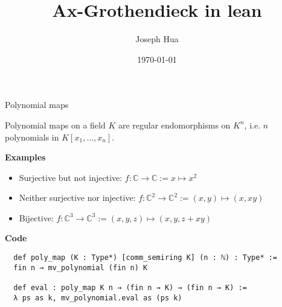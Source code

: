 \documentclass[10pt]{beamer}
\title{Ax-Grothendieck in lean}
\subtitle{Joseph Hua}
\date{\today}
\institute{Imperial College London}
\newcommand{\C}{\mathbb{C}}
\newcommand{\<}{\langle}
\renewcommand{\>}{\rangle}
\newcommand{\link}[1]{\hypertarget{#1}{}}
\begin{document}
\maketitle

\begin{frame}[fragile]{Polynomial maps}

  \begin{definition}
    \link{poly_map}
    Polynomial maps on a field $K$ are regular endomorphisms on $K^{n}$,
    i.e. $n$ polynomials in $K[x_1,\dots,x_{n}]$.
  \end{definition}

  \pause

  \textbf{Examples}

  \begin{itemize}
    \item <2-> Surjective but not injective: $f : \C \to \C := x \mapsto x^{2}$

    \item <3-> Neither surjective nor injective:
          $f : \C^{2} \to \C^{2} := (x,y) \mapsto (x,xy)$
    \item <4-> Bijective:
          $f : \C^{3} \to \C^{3} := (x,y,z) \mapsto ( x , y , z + xy )$
  \end{itemize}
  \pause \pause \pause

  \textbf{Code}

  \begin{lstlisting}
  def poly_map (K : Type*) [comm_semiring K] (n : ℕ) : Type* :=
  fin n → mv_polynomial (fin n) K

  def eval : poly_map K n → (fin n → K) → (fin n → K) :=
  λ ps as k, mv_polynomial.eval as (ps k) \end{lstlisting}

\end{frame}
\end{document}
